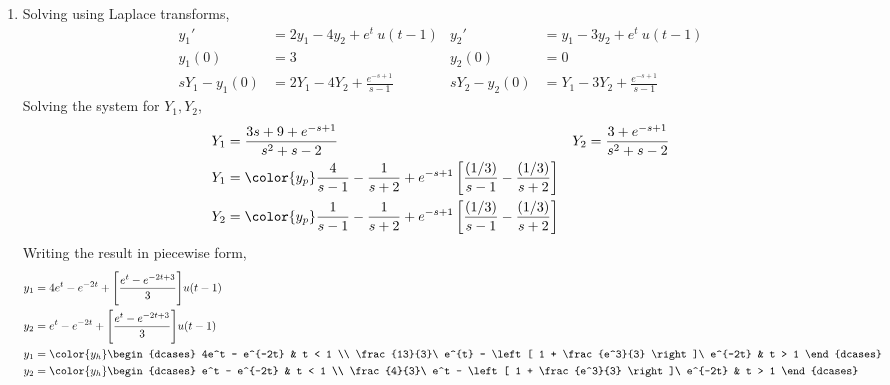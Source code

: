 \begin{enumerate}
    \item Solving using Laplace transforms,
          \begin{align}
              y_1'          & = 2y_1 - 4y_2 + e^t\ u(t-1)          &
              y_2'          & = y_1 - 3y_2 + e^t\ u(t-1)             \\
              y_1(0)        & = 3                                  &
              y_2(0)        & = 0                                    \\
              sY_1 - y_1(0) & = 2Y_1 - 4Y_2 + \frac{e^{-s+1}}{s-1} &
              sY_2 - y_2(0) & = Y_1 - 3Y_2 + \frac{e^{-s+1}}{s-1}
          \end{align}
          Solving the system for $ Y_1, Y_2 $,
          \begin{align}
              Y_1 & = \frac{3s + 9 + e^{-s+1}}{s^2 + s - 2}                &
              Y_2 & = \frac{3 + e^{-s+1}}{s^2 + s - 2}                       \\
              Y_1 & = \color{y_p} \frac{4}{s-1} - \frac{1}{s+2} + e^{-s+1}
              \left[ \frac{(1/3)}{s-1} - \frac{(1/3)}{s+2} \right]           \\
              Y_2 & = \color{y_p} \frac{1}{s-1} - \frac{1}{s+2} + e^{-s+1}
              \left[ \frac{(1/3)}{s-1} - \frac{(1/3)}{s+2} \right]           \\
          \end{align}
          Writing the result in piecewise form,
          \begin{align}
              y_1 & = 4e^t - e^{-2t} + \Bigg[ \frac{e^{t} - e^{-2t+3}}{3} \Bigg]
              u(t-1)                                                             \\
              y_2 & = e^t - e^{-2t} +  \Bigg[ \frac{e^{t} - e^{-2t+3}}{3} \Bigg]
              u(t-1)                                                             \\
              y_1 & = \color{y_h}
              \begin{dcases}
                  4e^t - e^{-2t}                              & t < 1 \\
                  \frac{13}{3}\ e^{t}
                  - \left[ 1 + \frac{e^3}{3} \right]\ e^{-2t} & t > 1
              \end{dcases}      \\
              y_2 & = \color{y_h}
              \begin{dcases}
                  e^t - e^{-2t}                               & t < 1 \\
                  \frac{4}{3}\ e^t
                  - \left[ 1 + \frac{e^3}{3} \right]\ e^{-2t} & t > 1
              \end{dcases}
          \end{align}


\end{enumerate}

